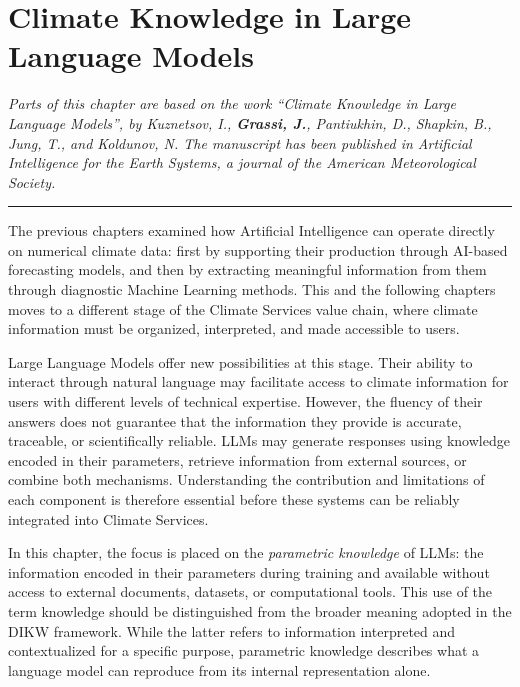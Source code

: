 \chapter{Climate Knowledge in Large Language Models}

\ifpdf
    \graphicspath{{Chapter4/Figs/}{Chapter4/Figs/PDF/}{Chapter4/Figs/}}
\else
    \graphicspath{{Chapter4/Figs/Vector/}{Chapter4/Figs/}}
\fi

\noindent\textit{Parts of this chapter are based on the work \emph{``Climate Knowledge in Large Language Models''}, by Kuznetsov, I., \textbf{Grassi, J.}, Pantiukhin, D., Shapkin, B., Jung, T., and Koldunov, N. The manuscript has been published in Artificial Intelligence for the Earth Systems, a journal of the American Meteorological Society.}

\vspace{0.5em}
\begin{center}
    \rule{0.5\textwidth}{0.4pt}
\end{center}
\vspace{0.5em}

The previous chapters examined how Artificial Intelligence can operate directly on numerical climate data: first by supporting their production through AI-based forecasting models, and then by extracting meaningful information from them through diagnostic Machine Learning methods. This and the following chapters moves to a different stage of the Climate Services value chain, where climate information must be organized, interpreted, and made accessible to users.

Large Language Models offer new possibilities at this stage. Their ability to interact through natural language may facilitate access to climate information for users with different levels of technical expertise. However, the fluency of their answers does not guarantee that the information they provide is accurate, traceable, or scientifically reliable. LLMs may generate responses using knowledge encoded in their parameters, retrieve information from external sources, or combine both mechanisms. Understanding the contribution and limitations of each component is therefore essential before these systems can be reliably integrated into Climate Services.

In this chapter, the focus is placed on the \emph{parametric knowledge} of LLMs: the information encoded in their parameters during training and available without access to external documents, datasets, or computational tools. This use of the term knowledge should be distinguished from the broader meaning adopted in the DIKW framework. While the latter refers to information interpreted and contextualized for a specific purpose, parametric knowledge describes what a language model can reproduce from its internal representation alone.

